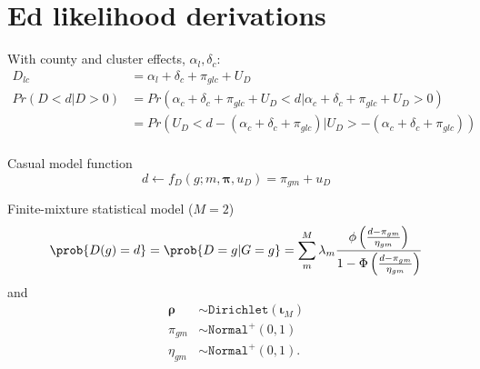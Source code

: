 \documentclass{article}
\begin{document}
    

\section*{Ed likelihood derivations}

With county and cluster effects, $\alpha_l, \delta_c$:
\begin{align*}
  D_{lc} &= \alpha_l + \delta_c + \pi_{glc} + U_D \\
  Pr(D < d | D > 0 ) &= Pr(\alpha_c + \delta_c + \pi_{glc} + U_D < d | 
  \alpha_c + \delta_c + \pi_{glc} + U_D > 0) \\
   &= Pr( U_D < d -  (\alpha_c + \delta_c + \pi_{glc})  | 
    U_D > - (\alpha_c + \delta_c + \pi_{glc})) \\
\end{align*}







 Casual model function 
 \begin{equation*}  
   d \leftarrow f_D(g; m, \boldsymbol{\pi}, u_D) = \pi_{gm} + u_D 
 \end{equation*} 


 Finite-mixture statistical model ($M = 2$) 
 \begin{align*} 
 \prob{D(g) = d} = \prob{D = g | G = g} = \sum_m^M \lambda_m \frac{\phi\left(\frac{d - \pi_{gm}}{\eta_{gm}}\right)}{1 - \Phi\left(\frac{d - \pi_{gm}}{\eta_{gm}}\right)}  
 \end{align*} 
 and 
 \begin{align*} 
   \boldsymbol{\rho} &\sim \mathtt{Dirichlet}(\boldsymbol{\iota}_M) \\ 
   \pi_{gm} &\sim \mathtt{Normal^+}(0, 1) \\ 
   \eta_{gm} &\sim \mathtt{Normal^+}(0, 1). 
 \end{align*} 
\end{document}
